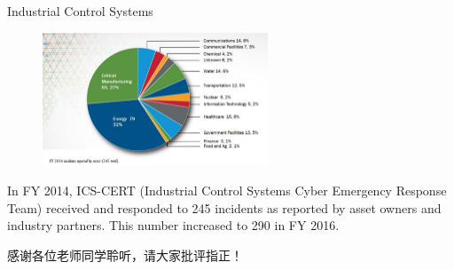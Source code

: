 \documentclass[10pt]{beamer}
\begin{document}
\begin{frame}{Industrial Control Systems}
  \begin{figure}[ht]
    \centering
    \includegraphics[width=0.6\textwidth]{cert.jpg}
  \end{figure}
  In FY 2014, ICS-CERT (Industrial Control Systems Cyber Emergency Response Team) received and responded to 245 incidents as reported by asset owners and industry partners. This number increased to 290 in FY 2016.
\end{frame}

\begin{frame}[standout]
  感谢各位老师同学聆听，请大家批评指正！
\end{frame}
\end{document}
